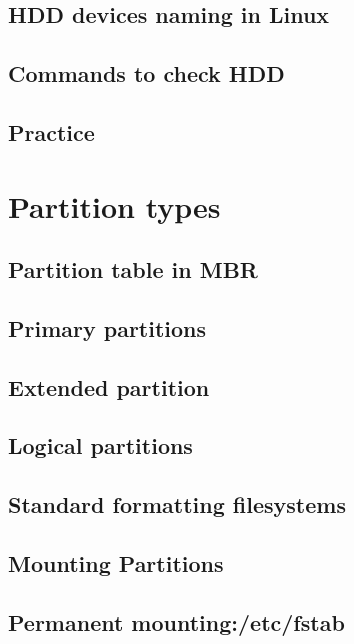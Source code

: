 \documentclass[14pt,fleqn]{extbook} %
\begin{document}
\subsection{HDD devices naming in Linux}

\subsection{Commands to check HDD}

\subsection{Practice}


\section{Partition types}

\subsection{Partition table in MBR}

\subsection{Primary partitions}

\subsection{Extended partition}

\subsection{Logical partitions}

\subsection{Standard formatting filesystems}

\subsection{Mounting Partitions}

\subsection{Permanent mounting:/etc/fstab}

\end{document}
